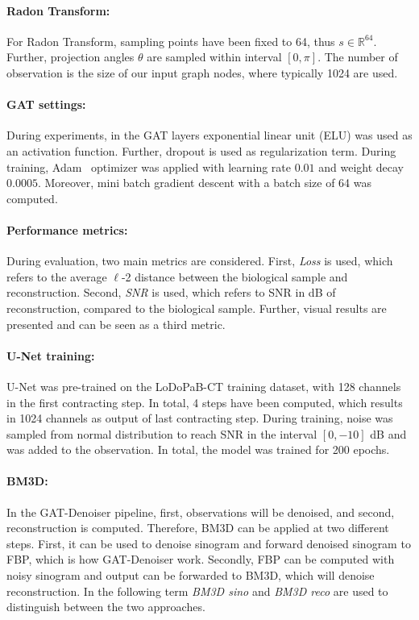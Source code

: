 \paragraph{Radon Transform:}
For Radon Transform, sampling points have been fixed to 64, thus $s \in \mathbb{R}^{64}$.
Further, projection angles $\theta$ are sampled within interval $[0, \pi]$.
The number of observation is the size of our input graph nodes, where typically 1024 are used.

\paragraph{GAT settings:}
During experiments, in the GAT layers exponential linear unit (ELU) was used as an activation function.
Further, dropout is used as regularization term.
During training, Adam~\cite{adam} optimizer was applied with learning rate $0.01$ and weight decay $0.0005$.
Moreover, mini batch gradient descent with a batch size of 64 was computed.

\paragraph{Performance metrics:}
During evaluation, two main metrics are considered.
First, \textit{Loss} is used, which refers to the average $\ell$-2 distance between the biological sample and reconstruction.
Second, \textit{SNR} is used, which refers to SNR in dB of reconstruction, compared to the biological sample.
Further, visual results are presented and can be seen as a third metric.


\paragraph{U-Net training:}
U-Net was pre-trained on the LoDoPaB-CT training dataset, with 128 channels in the first contracting step. 
In total, 4 steps have been computed, which results in 1024 channels as output of last contracting step.
During training, noise was sampled from normal distribution to reach SNR in the interval $[0, -10]$ dB 
and was added to the observation. In total, the model was trained for 200 epochs.

\paragraph{BM3D:}
In the GAT-Denoiser pipeline, first, observations will be denoised, and second, reconstruction is computed.
Therefore, BM3D can be applied at two different steps. First, it can be used to denoise sinogram
and forward denoised sinogram to FBP, which is how GAT-Denoiser work. Secondly, FBP can be
computed with noisy sinogram and output can be forwarded to BM3D, which will denoise reconstruction.
In the following term \textit{BM3D sino} and \textit{BM3D reco} are used to distinguish between the two approaches.


